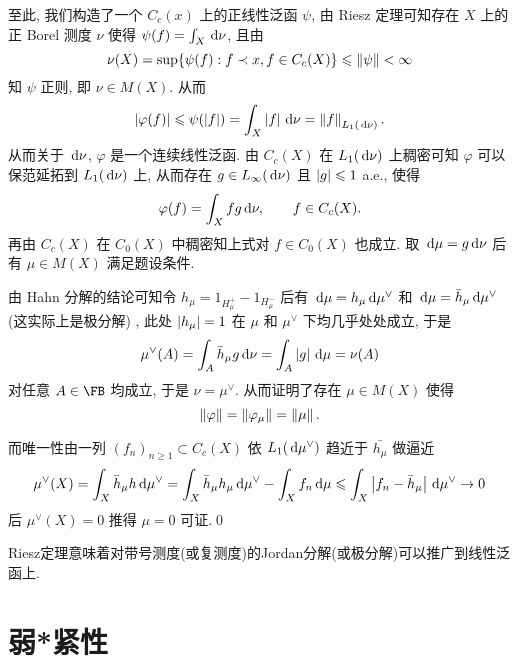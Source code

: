 \begin{Proof}
		至此, 我们构造了一个 $ C_c(x) $ 上的正线性泛函 $ \psi $, 由 Riesz 定理可知存在 $ X $ 上的正 Borel 测度 $ \nu $ 使得 $ \psi(f)=\int_X\,\mathrm{d}\nu $, 且由
		\[
			\nu(X)=\sup\{\psi(f) : f\prec x, f\in C_c(X)\}\leqslant\left\| \psi \right\|<\infty
		\]
		知 $ \psi $ 正则, 即 $ \nu\in M(X) $. 从而
		\[
			\left| \varphi(f) \right| \leqslant\psi(\left| f \right| )=\int_X\left| f \right| \,\mathrm{d}\nu=\left\| f \right\|_{L_1(\,\mathrm{d}\nu)}.
		\]
		从而关于 $ \,\mathrm{d}\nu $, $ \varphi $ 是一个连续线性泛函. 由 $ C_c(X) $ 在 $ L_1(\,\mathrm{d}\nu) $ 上稠密可知 $ \varphi $ 可以保范延拓到 $ L_1(\,\mathrm{d}\nu) $ 上, 从而存在 $ g\in L_\infty(\,\mathrm{d}\nu) $ 且 $ \left| g \right| \leqslant 1 $ a.e., 使得
		\[
			\varphi(f)=\int_Xfg\,\mathrm{d}\nu,\qquad f\in C_c(X).
		\]
		再由 $ C_c(X) $ 在 $ C_0(X) $ 中稠密知上式对 $ f\in C_0(X) $ 也成立. 取 $ \,\mathrm{d}\mu=g\,\mathrm{d}\nu $ 后有 $ \mu\in M(X) $ 满足题设条件.

		由 Hahn 分解的结论可知令 $ h_\mu=1_{H_\mu^+}-1_{H_\mu^-} $ 后有 $ \,\mathrm{d}\mu=h_\mu\,\mathrm{d}\mu^\lor $ 和 $ \,\mathrm{d}\mu=\bar{h}_\mu\,\mathrm{d}\mu^\lor $ (这实际上是极分解) , 此处 $ \left| h_\mu \right| =1 $ 在 $ \mu $ 和 $ \mu^\lor $ 下均几乎处处成立, 于是
		\[
			\mu^\lor(A)=\int_A\bar{h}_\mu g\,\mathrm{d}\nu=\int_A\left| g \right| \,\mathrm{d}\mu=\nu(A)
		\]
		对任意 $ A\in\FB $ 均成立, 于是 $ \nu=\mu^\lor $. 从而证明了存在 $ \mu\in M(X) $ 使得
		\[
			\left\| \varphi \right\|=\left\| \varphi_\mu \right\|=\left\| \mu \right\|.
		\]

		而唯一性由一列 $ (f_n)_{n\geqslant 1}\subset C_c(X) $ 依 $ L_1(\,\mathrm{d}\mu^\lor) $ 趋近于 $ \bar{h_\mu} $ 做逼近
		\[
			\mu^\lor(X)=\int_X\bar{h}_\mu h\,\mathrm{d}\mu^\lor=\int_X\bar{h}_\mu h_\mu\,\mathrm{d}\mu^\lor-\int_Xf_n\,\mathrm{d}\mu\leqslant\int_X\left| f_n-\bar{h}_\mu \right| \,\mathrm{d}\mu^\lor\to 0
		\]
		后 $ \mu^\lor(X)=0 $ 推得 $ \mu=0 $ 可证.\qed
	\end{Proof}

	Riesz定理意味着对带号测度(或复测度)的Jordan分解(或极分解)可以推广到线性泛函上.


\section{弱*紧性}
	
